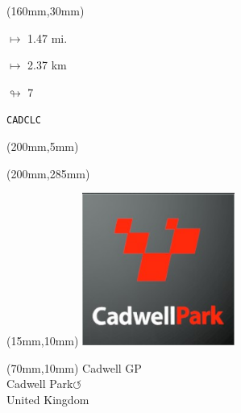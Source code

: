 \begin{textblock*}{40mm}(160mm,30mm)%
\Large
\par$\mapsto$ 1.47 mi.
\par$\mapsto$ 2.37 km
\par$\looparrowright$ 7
\par\hfill\tiny\tt CADCLC\\
\end{textblock*}
\begin{textblock*}{20mm}(200mm,5mm)%
\fbox{\thepage}
\label{CADCLC}
\end{textblock*}
\begin{textblock*}{20mm}(200mm,285mm)%
\fbox{\thepage}
\end{textblock*}

\null\newpage
\begin{textblock*}{50mm}(15mm,10mm)%
\includegraphics[width=50mm]{LG/2015-05-20_00076.png}
\end{textblock*}
\begin{textblock*}{130mm}(70mm,10mm)%
{\fontsize{20}{20}\selectfont Cadwell GP\\}
{\fontsize{16}{16}\selectfont Cadwell Park\hfill \huge$\circlearrowleft$\\}
{\fontsize{12}{12}\selectfont United Kingdom\\}
\end{textblock*}
